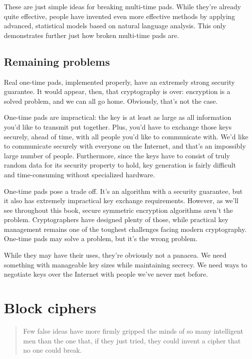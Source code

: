 \documentclass[11pt,ebook,table,dvipsnames]{memoir}
\begin{document}
These are just simple ideas for breaking multi-time pads. While
they're already quite effective, people have invented even more
effective methods by applying advanced, statistical models based on
natural language analysis. This only demonstrates further just how
broken multi-time pads are. \cite{mason:nltwotimepads}
\section{Remaining problems}
\label{sec-2-1-6}

Real one-time pads, implemented properly, have an extremely strong
security guarantee. It would appear, then, that cryptography is over:
encryption is a solved problem, and we can all go home. Obviously,
that's not the case.

One-time pads are impractical: the key is at least as large as all
information you'd like to transmit put together. Plus, you'd have to
exchange those keys securely, ahead of time, with all people you'd
like to communicate with. We'd like to communicate securely with
everyone on the Internet, and that's an impossibly large number of
people. Furthermore, since the keys have to consist of truly random
data for its security property to hold, key generation is fairly
difficult and time-consuming without specialized hardware.

One-time pads pose a trade off. It's an algorithm with a security
guarantee, but it also has extremely impractical key exchange
requirements. However, as we'll see throughout this book, secure
symmetric encryption algorithms aren't the problem. Cryptographers
have designed plenty of those, while practical key management remains
one of the toughest challenges facing modern cryptography. One-time
pads may solve a problem, but it's the wrong problem.

While they may have their uses, they're obviously not a panacea. We
need something with manageable key sizes while maintaining secrecy. We
need ways to negotiate keys over the Internet with people we've never
met before.
\chapter{Block ciphers}
\label{sec-2-2}

\begin{quotation}
Few false ideas have more firmly gripped the minds of so many intelligent men
than the one that, if they just tried, they could invent a cipher that no one
could break.
\end{quotation}
\end{document}

